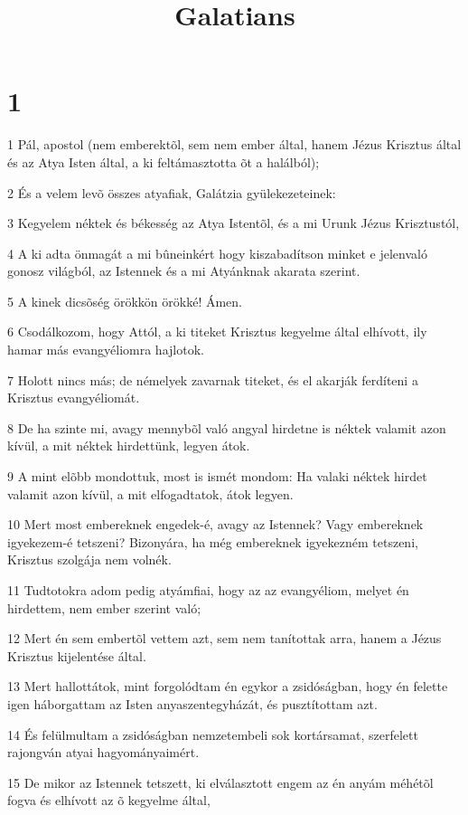 

\title{Galatians}


\chapter{1}

\par 1 Pál, apostol (nem emberektõl, sem nem ember által, hanem Jézus Krisztus által és az Atya Isten által, a ki feltámasztotta õt a halálból);
\par 2 És a velem levõ összes atyafiak, Galátzia gyülekezeteinek:
\par 3 Kegyelem néktek és békesség az Atya Istentõl, és a mi Urunk Jézus Krisztustól,
\par 4 A ki adta önmagát a mi bûneinkért hogy kiszabadítson minket  e jelenvaló gonosz világból, az Istennek és a mi Atyánknak akarata szerint.
\par 5 A kinek dicsõség örökkön örökké! Ámen.
\par 6 Csodálkozom, hogy Attól, a ki titeket Krisztus kegyelme által elhívott, ily hamar más evangyéliomra hajlotok.
\par 7 Holott nincs más; de némelyek zavarnak titeket, és el akarják ferdíteni a Krisztus evangyéliomát.
\par 8 De ha szinte mi, avagy mennybõl való angyal hirdetne is néktek valamit azon kívül, a mit néktek hirdettünk, legyen átok.
\par 9 A mint elõbb mondottuk, most is ismét mondom: Ha valaki néktek hirdet valamit azon kívül, a mit elfogadtatok, átok legyen.
\par 10 Mert most embereknek engedek-é, avagy az Istennek? Vagy embereknek igyekezem-é tetszeni? Bizonyára, ha még embereknek igyekezném tetszeni, Krisztus szolgája nem volnék.
\par 11 Tudtotokra adom pedig atyámfiai, hogy az az evangyéliom, melyet én hirdettem, nem ember szerint való;
\par 12 Mert én sem embertõl vettem azt, sem nem tanítottak arra, hanem a Jézus Krisztus kijelentése által.
\par 13 Mert hallottátok, mint forgolódtam én egykor a zsidóságban, hogy én felette igen háborgattam az Isten anyaszentegyházát, és pusztítottam azt.
\par 14 És felülmultam a zsidóságban nemzetembeli sok kortársamat, szerfelett rajongván atyai hagyományaimért.
\par 15 De mikor az Istennek tetszett, ki elválasztott engem az én anyám méhétõl fogva és elhívott az õ kegyelme által,
